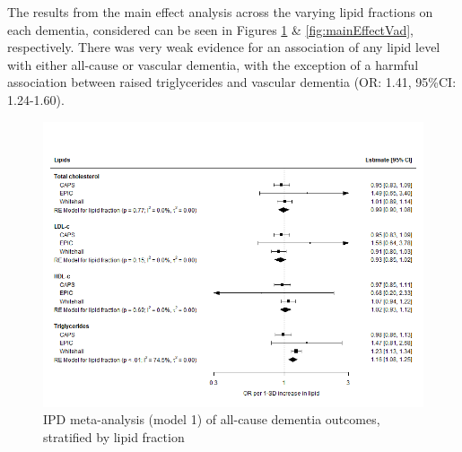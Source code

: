 \documentclass[a4paper, twoside]{templates/ociamthesis}
\begin{document}
The results from the main effect analysis across the varying lipid fractions on each dementia, considered can be seen in Figures \ref{fig:mainEffectDem} \& \ref{fig:mainEffectVad}, respectively. There was very weak evidence for an association of any lipid level with either all-cause or vascular dementia, with the exception of a harmful association between raised triglycerides and vascular dementia (OR: 1.41, 95\%CI: 1.24-1.60).





\begin{figure}[H]
\includegraphics[width=1\linewidth]{figures/ipd/main_Dementia} \caption[IPD meta-analysis of all-cause dementia, stratified by lipid fraction]{IPD meta-analysis (model 1) of all-cause dementia outcomes, stratified by lipid fraction}\label{fig:mainEffectDem}
\end{figure}
\end{document}
